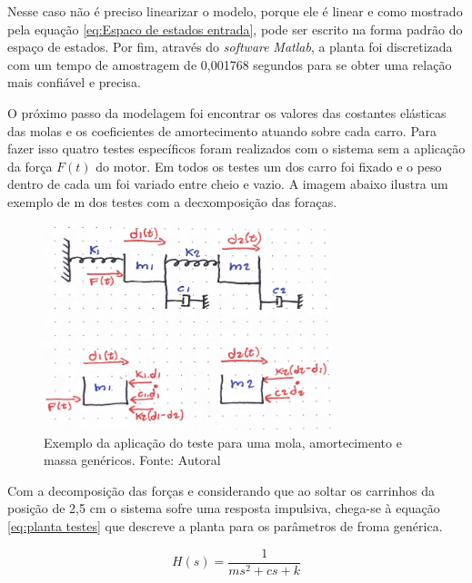 \documentclass{ifacconf}
\begin{document}
Nesse caso não é preciso linearizar o modelo, porque ele é linear e como mostrado pela equação \ref{eq:Espaco de estados entrada}, pode ser escrito na forma padrão do espaço de estados. Por fim, através do \textit{software} \textit{Matlab}, a planta foi discretizada com um tempo de amostragem de 0,001768 segundos para se obter uma relação mais confiável e precisa.

O próximo passo da modelagem foi encontrar os valores das costantes elásticas das molas e os coeficientes de amortecimento atuando sobre cada carro. Para fazer isso quatro testes específicos foram realizados com o sistema sem a aplicação da força $F(t)$ do motor. Em todos os testes um dos carro foi fixado e o peso dentro de cada um foi variado entre cheio e vazio. A imagem abaixo ilustra um exemplo de m dos testes com a decxomposição das foraças.

\begin{figure}[!htb]
    \begin{center}
    \includegraphics[width=8.4cm]{figures/Desenho_testes.png}    %
    \caption{Exemplo da aplicação do teste para uma mola, amortecimento e massa genéricos. Fonte: Autoral} 
    \label{fig:Desenho_testes}
    \end{center}
  \end{figure}

Com a decomposição das forças e considerando que ao soltar os carrinhos da posição de 2,5 cm o sistema sofre uma resposta impulsiva, chega-se à equação \ref{eq:planta testes} que descreve a planta para os parâmetros de froma genérica.

\begin{equation}
    \label{eq:planta testes}
    H(s)  = \frac{1}{ms^2+cs+k}
\end{equation}
\end{document}
